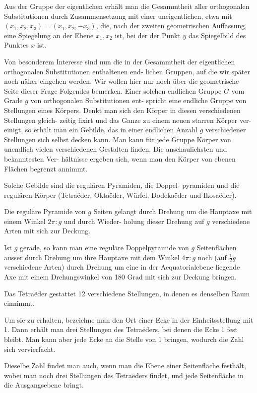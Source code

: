\documentclass[12pt,a4paper]{article}
\theoremstyle{plain}
\theoremstyle{definition}
\theoremstyle{remark}
\begin{document}
Aus der Gruppe der eigentlichen erh\"alt man die Gesammtheit
aller orthogonalen Substitutionen durch Zusammensetzung
mit einer uneigentlichen, etwa mit $(x_1, x_2, x_3) = (x_1, x_2, -x_3)$, die,
nach der zweiten geometrischen Auffassung, eine Spiegelung an
der Ebene $x_1, x_2$ ist, bei der der Punkt $y$ das Spiegelbild des
Punktes $x$ ist.

Von besonderem Interesse sind nun die in der Gesammtheit
der eigentlichen orthogonalen Substitutionen enthaltenen end-
lichen Gruppen, auf die wir sp\"ater noch n\"aher eingehen
werden. Wir wollen hier nur noch \"uber die geometrische Seite
dieser Frage Folgendes bemerken. Einer solchen endlichen
Gruppe $G$ vom Grade $g$ von orthogonalen Substitutionen ent-
spricht eine endliche Gruppe von Stellungen eines K\"orpers. Denkt
man sich den K\"orper in diesen verschiedenen Stellungen gleich-
zeitig fixirt und das Ganze zu einem neuen starren K\"orper ver-
einigt, so erh\"alt man ein Gebilde, das in einer endlichen Anzahl
$g$ verschiedener Stellungen sich selbst decken kann. Man kann
f\"ur jede Gruppe K\"orper von unendlich vielen verschiedenen
Gestalten finden. Die anschaulichsten und bekanntesten Ver-
h\"altnisse ergeben sich, wenn man den K\"orper von ebenen Fl\"achen
begrenzt annimmt.

Solche Gebilde sind die regul\"aren Pyramiden, die Doppel-
pyramiden und die regul\"aren K\"orper (Tetra\"eder, Okta\"eder,
W\"urfel, Dodeka\"eder und Ikosa\"eder).

Die regul\"are Pyramide von $g$ Seiten gelangt durch Drehung
um die Hauptaxe mit einem Winkel $2\pi : g$ und durch Wieder-
holung dieser Drehung auf $g$ verschiedene Arten mit sich zur
Deckung.

Ist $g$ gerade, so kann man eine regul\"are Doppelpyramide
von $g$ Seitenfl\"achen ausser durch Drehung um ihre Hauptaxe
mit dem Winkel $4\pi : g$ noch (auf $\tfrac{1}{2}g$ verschiedene Arten)
durch Drehung um eine in der Aequatorialebene liegende Axe
mit einem Drehungswinkel von 180 Grad mit sich zur Deckung
bringen.

Das Tetra\"eder gestattet 12 verschiedene Stellungen, in denen
es denselben Raum einnimmt.

Um sie zu erhalten, bezeichne man den Ort einer Ecke in
der Einheitsstellung mit 1. Dann erh\"alt man drei Stellungen
des Tetra\"eders, bei denen die Ecke 1 fest bleibt. Man kann
aber jede Ecke an die Stelle von 1 bringen, wodurch die Zahl
sich vervierfacht.

Dieselbe Zahl findet man auch, wenn man die Ebene einer
Seitenfl\"ache festh\"alt, wobei man noch drei Stellungen des
Tetra\"eders findet, und jede Seitenfl\"ache in die Ausgangsebene
bringt.
\end{document}
